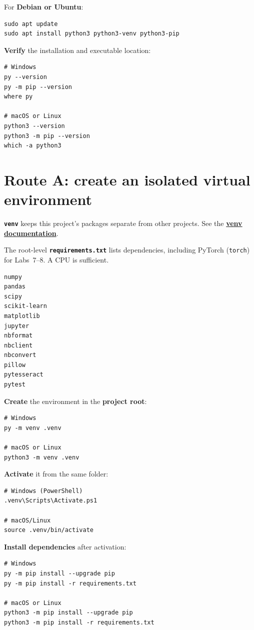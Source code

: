 For \textbf{Debian or Ubuntu}:

\begin{lstlisting}[style=mlterminal]
sudo apt update
sudo apt install python3 python3-venv python3-pip
\end{lstlisting}

\textbf{Verify} the installation and executable location:

\begin{lstlisting}[style=mlterminal]
# Windows
py --version
py -m pip --version
where py

# macOS or Linux
python3 --version
python3 -m pip --version
which -a python3
\end{lstlisting}

\section{Route A: create an isolated virtual environment}

\textbf{\texttt{venv}} keeps this project's packages separate from other projects. See the \href{https://docs.python.org/3/library/venv.html}{\textbf{venv documentation}}.

The root-level \textbf{\texttt{requirements.txt}} lists dependencies, including PyTorch (\texttt{torch}) for Labs~7--8. A CPU is sufficient.

\begin{lstlisting}[style=mlterminal]
numpy
pandas
scipy
scikit-learn
matplotlib
jupyter
nbformat
nbclient
nbconvert
pillow
pytesseract
pytest
\end{lstlisting}

\textbf{Create} the environment in the \textbf{project root}:

\begin{lstlisting}[style=mlterminal]
# Windows
py -m venv .venv

# macOS or Linux
python3 -m venv .venv
\end{lstlisting}

\textbf{Activate} it from the same folder:

\begin{lstlisting}[style=mlterminal]
# Windows (PowerShell)
.venv\Scripts\Activate.ps1

# macOS/Linux
source .venv/bin/activate
\end{lstlisting}

\textbf{Install dependencies} after activation:

\begin{lstlisting}[style=mlterminal]
# Windows
py -m pip install --upgrade pip
py -m pip install -r requirements.txt

# macOS or Linux
python3 -m pip install --upgrade pip
python3 -m pip install -r requirements.txt
\end{lstlisting}

